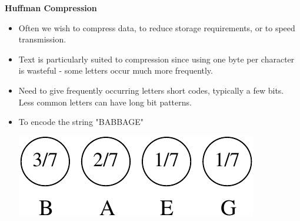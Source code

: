 \documentclass[a4,portraitt]{slides}
\begin{document}
\newpage
{\samepage
\begin{center}
{\Large{\bf Huffman Compression}}
\end{center}
\begin{itemize}
\item Often we wish to compress data, to reduce storage requirements, or to speed transmission.
\item  Text is particularly suited to compression since using one byte per character is wasteful - some letters occur much more frequently.
\item  Need to give frequently occurring letters short codes, typically a few bits. Less common letters can have long bit patterns.
\item To encode the string "BABBAGE"
\begin{center}
\includegraphics{../Images/huff1.pdf}
\end{center}
\end{itemize}
}
\end{document}
